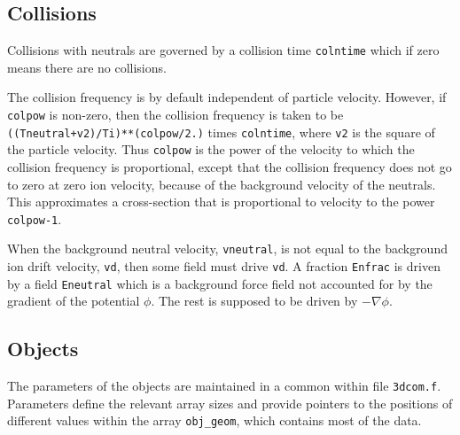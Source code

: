 \documentclass[12pt]{article}
\begin{document}
\subsection{Collisions}

Collisions with neutrals are governed by a collision time
\verb!colntime! which if zero means there are no collisions.


The collision frequency is by default independent of particle
velocity. However, if \verb!colpow! is non-zero, then the collision
frequency is taken to be \verb!((Tneutral+v2)/Ti)**(colpow/2.)! times
\verb!colntime!, where \verb!v2! is the square of the particle
velocity. Thus \verb!colpow! is the power of the velocity to which the
collision frequency is proportional, except that the collision
frequency does not go to zero at zero ion velocity, because of the
background velocity of the neutrals. This approximates a cross-section
that is proportional to velocity to the power \verb!colpow-1!.

When the background neutral velocity, \verb!vneutral!, is not equal to
the background ion drift velocity, \verb!vd!, then some field must
drive \verb!vd!. A fraction \verb!Enfrac! is driven by a field
\verb!Eneutral! which is a background force field not accounted for by
the gradient of the potential $\phi$. The rest is supposed to be
driven by $-\nabla\phi$.

\subsection{Objects}

The parameters of the objects are maintained in a common within file
\verb!3dcom.f!. Parameters define the relevant array sizes and provide
pointers to the positions of different values within the array
\verb!obj_geom!, which contains most of the data.
\end{document}
